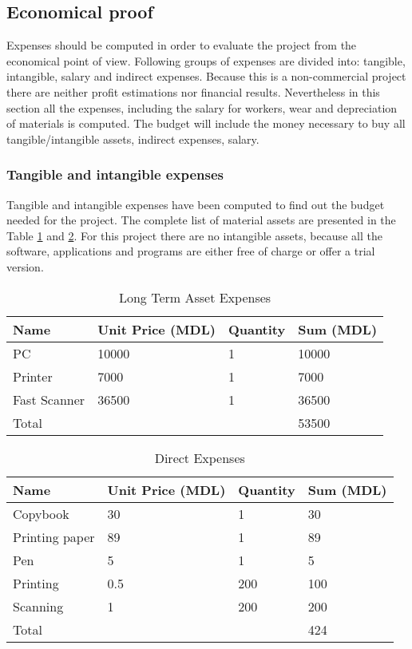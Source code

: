 \subsection{Economical proof}

Expenses should be computed in order to evaluate the project from the economical point of view. Following groups of expenses are divided into: tangible, intangible, salary and indirect expenses. Because this is a non-commercial project there are neither profit estimations nor financial results. Nevertheless in this section all the expenses, including the salary for workers, wear and depreciation of materials is computed. The budget will include the money necessary to buy all tangible/intangible assets, indirect expenses, salary. 

\subsubsection{Tangible and intangible expenses}
Tangible and intangible expenses have been computed to find out the budget needed for the project. The complete list of material assets are presented in the Table \ref{longterm_asset_expenses} and \ref{direct_expenses}. For this project there are no intangible assets, because all the software, applications and programs are either free of charge or offer a trial version. 

\begin{table}[ht!]
\centering
\caption{Long Term Asset Expenses}
{
\renewcommand{\arraystretch}{1.25}
\begin{tabular}{ llll }
\hline
  Name & Unit Price (MDL) & Quantity & Sum (MDL) \\ \hline
  PC & 10000 & 1 & 10000 \\
  Printer & 7000 & 1 & 7000 \\
  Fast Scanner & 36500 & 1 & 36500 \\
  Total & & & 53500 \\
\hline
\end{tabular}
}
\label{longterm_asset_expenses}
\end{table}

\begin{table}[ht!]
\centering
\caption{Direct Expenses}
{
\renewcommand{\arraystretch}{1.25}
\begin{tabular}{ llll }
\hline
  Name & Unit Price (MDL) & Quantity & Sum (MDL) \\ \hline
  Copybook & 30 & 1 & 30 \\
  Printing paper & 89 & 1 & 89 \\
  Pen & 5 & 1 & 5 \\
  Printing & 0.5 & 200 & 100 \\
  Scanning & 1 & 200 & 200 \\
  Total & & & 424 \\
\hline
\end{tabular}
}
\label{direct_expenses}
\end{table}


